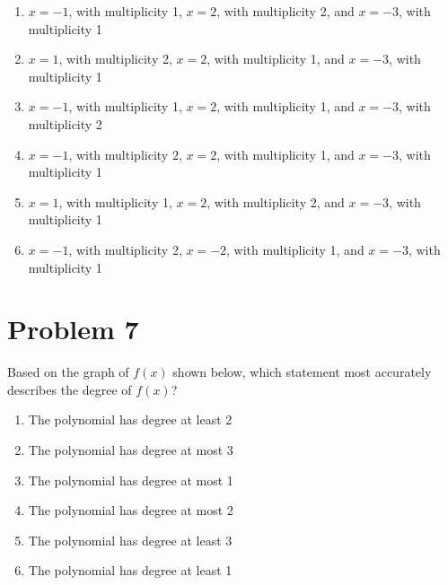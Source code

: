 \documentclass[12pt]{article}
\begin{document}
\newpage
\begin{enumerate}[label=\Alph*)]
    \item $x = -1$, with multiplicity 1, $x = 2$, with multiplicity 2, and $x = -3$, with multiplicity 1
    \item $x = 1$, with multiplicity 2, $x = 2$, with multiplicity 1, and $x = -3$, with multiplicity 1
    \item $x = -1$, with multiplicity 1, $x = 2$, with multiplicity 1, and $x = -3$, with multiplicity 2
    \item $x = -1$, with multiplicity 2, $x = 2$, with multiplicity 1, and $x = -3$, with multiplicity 1
    \item $x = 1$, with multiplicity 1, $x = 2$, with multiplicity 2, and $x = -3$, with multiplicity 1
    \item $x = -1$, with multiplicity 2, $x = -2$, with multiplicity 1, and $x = -3$, with multiplicity 1
\end{enumerate}

\section*{Problem 7}
Based on the graph of $f(x)$ shown below, which statement most accurately describes the degree of $f(x)$?

\begin{center}
\end{center}

\begin{enumerate}[label=\Alph*)]
    \item The polynomial has degree at least 2
    \item The polynomial has degree at most 3
    \item The polynomial has degree at most 1
    \item The polynomial has degree at most 2
    \item The polynomial has degree at least 3
    \item The polynomial has degree at least 1
\end{enumerate}
\end{document}
